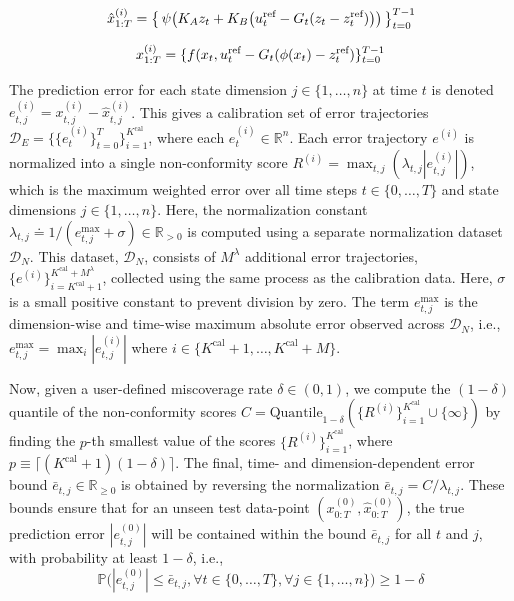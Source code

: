 \documentclass{l4dc2026}
\begin{document}
\noindent\begin{minipage}[b]{0.54\textwidth}
\begin{equation}\small
\label{eq:latent_rollout}
\hspace{-5pt}\hat{x}_{1:T}^{(i)} =
\bigl\{\, \psi\bigl(K_{A} z_{t} + K_{B}\bigl(u^{\text{ref}}_t - G_t(z_t - z^{\text{ref}}_t)\bigr)\bigr) \,\bigr\}_{t=0}^{T-1}\hspace{-6pt}
\end{equation}
\end{minipage}
\hspace{\fill} 
\begin{minipage}[b]{0.44\textwidth} 
\begin{equation}\small
\label{eq:actual_rollout}
\hspace{-1pt}x_{1:T}^{(i)} = \{f(x_t, u^{\text{ref}}_t - G_t (\phi(x_t) - z^{\text{ref}}_t)\}_{t=0}^{T-1}
\end{equation}
\end{minipage}

The prediction error for each state dimension $j \in \{1, \dots, n\}$ at time $t$ is denoted $e_{t,j}^{(i)} = x_{t,j}^{(i)} - \hat{x}_{t,j}^{(i)}$. This gives a calibration set of error trajectories $\mathcal{D}_{E} = \{\{e_{t}^{(i)}\}_{t=0}^{T}\}_{i=1}^{K^{\text{cal}}}$, where each $e_t^{(i)} \in \mathbb{R}^n$. Each error trajectory $e^{(i)}$ is normalized into a single non-conformity score $R^{(i)} = \max_{t,j} ( \lambda_{t,j} |e_{t,j}^{(i)}|)$, which is the maximum weighted error over all time steps $t \in \{0, \dots, T\}$ and state dimensions $j \in \{1, \dots, n\}$. Here, the normalization constant $\lambda_{t,j} \doteq 1 / (e_{t,j}^{\text{max}} + \sigma) \in \mathbb{R}_{> 0}$ is computed using a separate normalization dataset $\mathcal{D}_N$. This dataset, $\mathcal{D}_N$, consists of $M^{\lambda}$ additional error trajectories, $\{e^{(i)}\}_{i=K^{\text{cal}}+1}^{K^{\text{cal}}+M^{\lambda}}$, collected using the same process as the calibration data. Here, $\sigma$ is a small positive constant to prevent division by zero. The term $e_{t,j}^{\text{max}}$ is the dimension-wise and time-wise maximum absolute error observed across $\mathcal{D}_N$, i.e., $e_{t,j}^{\text{max}} = \max_{i} |e_{t,j}^{(i)}|$ where $i \in \{K^{\text{cal}}+1, \dots, K^{\text{cal}}+M\}$. 

Now, given a user-defined miscoverage rate $\delta \in (0, 1)$, we compute the $(1-\delta)$ quantile of the non-conformity scores $C = \text{Quantile}_{1-\delta}(\{R^{(i)}\}_{i=1}^{K^{\text{cal}}} \cup \{\infty\})$ by finding the $p$-th smallest value of the scores $\{R^{(i)}\}_{i=1}^{K^{\text{cal}}}$, where $p \equiv \lceil (K^{\text{cal}} + 1)(1-\delta) \rceil$. The final, time- and dimension-dependent error bound $\bar e_{t,j} \in \mathbb{R}_{\ge 0}$ is obtained by reversing the normalization $\bar e_{t,j} = C / \lambda_{t,j}$. These bounds ensure that for an unseen test data-point $(x_{0:T}^{(0)}, \hat x_{0:T}^{(0)})$, the true prediction error $|e_{t,j}^{(0)}|$ will be contained within the bound $\bar e_{t,j}$ for all $t$ and $j$, with probability at least $1-\delta$, i.e.,
$$\mathbb{P}\big( |e_{t,j}^{(0)}| \le \bar e_{t,j}, \forall t \in \{0, \dots, T\}, \forall j \in \{1, \dots, n\} \big) \ge 1 - \delta$$
\end{document}
